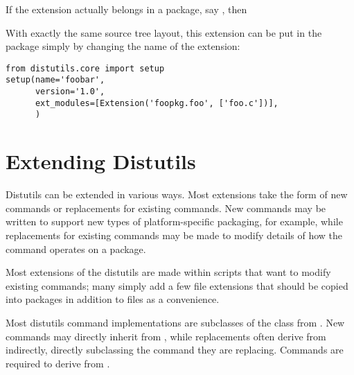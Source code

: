 \documentclass{manual}
\begin{document}
If the extension actually belongs in a package, say ,
then 

With exactly the same source tree layout, this extension can be put in
the  package simply by changing the name of the
extension:
\begin{verbatim}
from distutils.core import setup
setup(name='foobar',
      version='1.0',
      ext_modules=[Extension('foopkg.foo', ['foo.c'])],
      )
\end{verbatim}






\chapter{Extending Distutils \label{extending}}

Distutils can be extended in various ways.  Most extensions take the
form of new commands or replacements for existing commands.  New
commands may be written to support new types of platform-specific
packaging, for example, while replacements for existing commands may
be made to modify details of how the command operates on a package.

Most extensions of the distutils are made within 
scripts that want to modify existing commands; many simply add a few
file extensions that should be copied into packages in addition to
 files as a convenience.

Most distutils command implementations are subclasses of the
 class from .  New commands
may directly inherit from , while replacements often
derive from  indirectly, directly subclassing the
command they are replacing.  Commands are required to derive from
.


\end{document}
